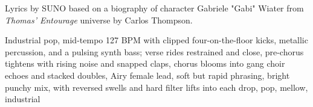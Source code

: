 
\begin{notes}
Lyrics by SUNO based on a biography of character Gabriele "Gabi" Wiater from \emph{Thomas’ Entourage} universe by Carlos Thompson.
\end{notes}
\begin{style}
Industrial pop, mid-tempo 127 BPM with clipped four-on-the-floor kicks, metallic percussion, and a pulsing synth bass; verse rides restrained and close, pre-chorus tightens with rising noise and snapped claps, chorus blooms into gang choir echoes and stacked doubles, Airy female lead, soft but rapid phrasing, bright punchy mix, with reversed swells and hard filter lifts into each drop, pop, mellow, industrial
\end{style}

